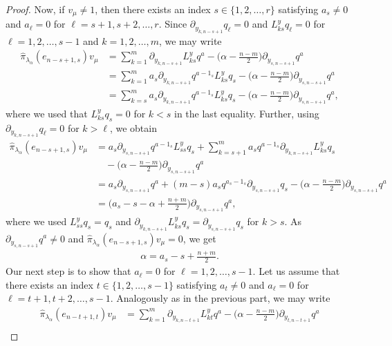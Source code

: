 \begin{proof}
Now, if $v_\mu \neq 1$, then there exists an index $s \in \{1,2,\dots,r\}$ satisfying $a_s \neq 0 $ and $a_\ell=0$ for $\ell=s+1,s+2,\dots,r$. Since $\partial_{y_{k,n-s+1}}q_\ell =0$ and $L^y_{ks}q_\ell=0$ for $\ell=1,2,\dots,s-1$ and $k=1,2,\dots,m$, we may write
\begin{align*}
   \hat{\pi}_{\lambda_\alpha}\!(e_{n-s+1,s})v_\mu &= \sum_{k=1}^m  \partial_{y_{k,n-s+1}} L^y_{ks}q^a - \big(\alpha - {\textstyle \frac{n-m}{2}} \big) \partial_{y_{s,n-s+1}}q^a \\
  &= \sum_{k=1}^m  a_s\partial_{y_{k,n-s+1}} q^{a-1_s}L^y_{ks}q_s - \big(\alpha - {\textstyle \frac{n-m}{2}} \big) \partial_{y_{s,n-s+1}}q^a \\
  &= \sum_{k=s}^m  a_s\partial_{y_{k,n-s+1}} q^{a-1_s}L^y_{ks}q_s - \big(\alpha - {\textstyle \frac{n-m}{2}} \big) \partial_{y_{s,n-s+1}}q^a,
\end{align*}
where we used that $L^y_{ks}q_s=0$ for $k<s$ in the last equality. Further, using $\partial_{y_{k,n-s+1}}q_\ell=0$ for $k > \ell$, we obtain
\begin{align*}
 \hat{\pi}_{\lambda_\alpha}\!(e_{n-s+1,s})v_\mu&= a_s\partial_{y_{s,n-s+1}} q^{a-1_s}L^y_{ss}q_s + \sum_{k=s+1}^m  a_s q^{a-1_s}\partial_{y_{k,n-s+1}}L^y_{ks}q_s \\
 & \quad - \big(\alpha - {\textstyle \frac{n-m}{2}} \big) \partial_{y_{s,n-s+1}}q^a \\
 &=a_s \partial_{y_{s,n-s+1}} q^a +(m-s)a_sq^{a_s-1_s}\partial_{y_{s,n-s+1}}q_s - \big(\alpha -{\textstyle \frac{n-m}{2}} \big) \partial_{y_{s,n-s+1}}q^a \\
 &= \big(a_s-s-\alpha+{\textstyle \frac{n+m}{2}}\big)\partial_{y_{s,n-s+1}}q^a,
\end{align*}
where we used $L^y_{ss}q_s=q_s$ and $\partial_{y_{k,n-s+1}}L^y_{ks}q_s=\partial_{y_{s,n-s+1}}q_s$ for $k>s$. As $\partial_{y_{s,n-s+1}}q^a \neq 0$ and $\hat{\pi}_{\lambda_\alpha}\!(e_{n-s+1,s})v_\mu=0$, we get
\begin{align}
  \alpha=a_s-s+\frac{n+m}{2}. \label{eq:weight alpha AGS}
\end{align}
Our next step is to show that $a_\ell=0$ for $\ell=1,2,\dots,s-1$. Let us assume that there exists an index $t \in \{1,2,\dots,s-1\}$ satisfying $a_t \neq 0$ and $a_\ell=0$ for $\ell=t+1,t+2,\dots,s-1$. Analogously as in the previous part, we may write
\begin{align*}
  \hat{\pi}_{\lambda_\alpha}\!(e_{n-t+1,t})v_\mu&= \sum_{k=1}^m  \partial_{y_{k,n-t+1}} L^y_{kt}q^a - \big(\alpha - {\textstyle \frac{n-m}{2}} \big)\partial_{y_{t,n-t+1}}q^a \\

\end{align*}
\end{proof}
